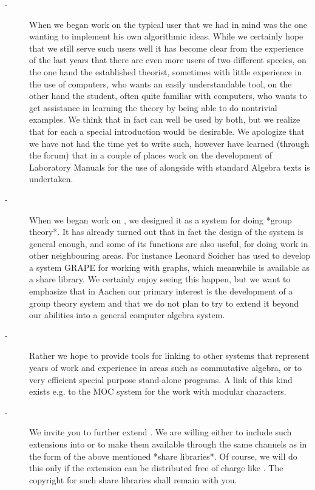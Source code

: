 \begin{description}

\item[-]

When we began work on {\GAP} the typical user that we had in mind was the
one  wanting to implement his  own algorithmic ideas.  While we certainly
hope that  we still serve  such users well  it has become clear  from the
experience  of the last  years  that there are   even more  users of  two
different species, on  the one hand  the established theorist,  sometimes
with little   experience in the  use  of computers, who   wants an easily
understandable tool, on the other  hand the student, often quite familiar
with computers, who  wants to get  assistance  in learning the theory  by
being able to do  nontrivial examples.  We  think that in fact {\GAP} can
well be used by both, but we realize that for each a special introduction
would be desirable.   We apologize that  we have not  had the time yet to
write such, however  have learned  (through the  {\GAP} forum) that  in a
couple of places  work on the  development of Laboratory Manuals  for the
use of {\GAP} alongside with standard Algebra texts is undertaken.

\item[-]

When we began work on {\GAP}, we designed it as a system for doing *group
theory*.  It has already turned out that in fact the design of the system
is general enough, and  some of its functions are  also useful, for doing
work in other neighbouring areas.   For instance Leonard Soicher has used
{\GAP}  to develop a  system {\sf GRAPE}   for working with graphs, which
meanwhile is  available  as a  share library.  We  certainly enjoy seeing
this happen, but we want to emphasize that in Aachen our primary interest
is the development of a  group theory system  and that we  do not plan to
try  to extend it beyond  our  abilities into  a general computer algebra
system.

\item[-]

Rather we hope to provide tools for linking  {\GAP} to other systems that
represent years  of work   and experience  in areas such   as commutative
algebra, or to  very efficient special purpose  stand-alone  programs.  A
link of this kind exists e.g. to the MOC system for the work with modular
characters.

\item[-]

We invite you to further extend {\GAP}.  We are willing either to include
such extensions  into {\GAP} or to  make them  available through the same
channels as {\GAP} in the form of the  above mentioned *share libraries*.
Of course, we will do this only if the  extension can be distributed free
of  charge  like {\GAP}.   The copyright  for  such share libraries shall
remain with you.


\end{description}
